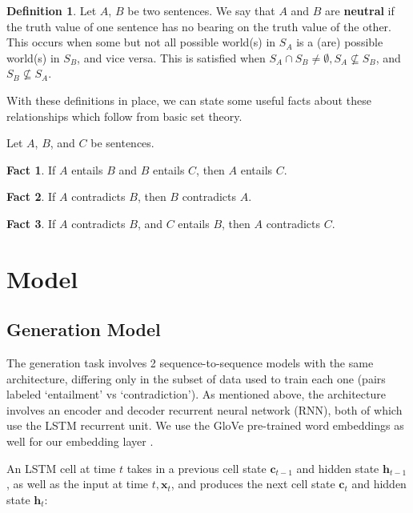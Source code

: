 \documentclass[a4paper, 12pt]{article}
\theoremstyle{definition}
\newtheorem{definition}{Definition}[section]
\newtheorem{fact}{Fact}[section]
\begin{document}
\begin{definition}
	Let $A$, $B$ be two sentences. We say that $A$ and $B$ are \textbf{neutral} if the truth value of one sentence has no bearing on the truth value of the other. This occurs when some but not all possible world(s) in $S_A$ is a (are) possible world(s) in $S_B$, and vice versa. This is satisfied when $S_A \cap S_B \neq \emptyset, S_A \nsubseteq S_B$, and $S_B \nsubseteq S_A$. \end{definition}

With these definitions in place, we can state some useful facts about these relationships which follow from basic set theory.

\bigskip

Let $A$, $B$, and $C$ be sentences.

\begin{fact}
	If $A$ entails $B$ and $B$ entails $C$, then $A$ entails $C$.
\end{fact}
\begin{fact}
	If $A$ contradicts $B$, then $B$ contradicts $A$.
\end{fact}
\begin{fact}
	If $A$ contradicts $B$, and $C$ entails $B$, then $A$ contradicts $C$.
\end{fact}

\section{Model}

\subsection{Generation Model}

The generation task involves 2 sequence-to-sequence models with the same architecture, differing only in the subset of data used to train each one (pairs labeled `entailment' vs `contradiction'). As mentioned above, the architecture involves an encoder and decoder recurrent neural network (RNN), both of which use the LSTM \cite{lstm-schmid} recurrent unit. We use the GloVe pre-trained word embeddings as well for our embedding layer \cite{glove}.

\bigskip

An LSTM cell at time $t$ takes in a previous cell state $\mathbf{c}_{t-1}$ and hidden state $\mathbf{h}_{t-1}$, as well as the input at time $t, \mathbf{x}_t$, and produces the next cell state $\mathbf{c}_t$ and hidden state $\mathbf{h}_t$:
\end{document}
